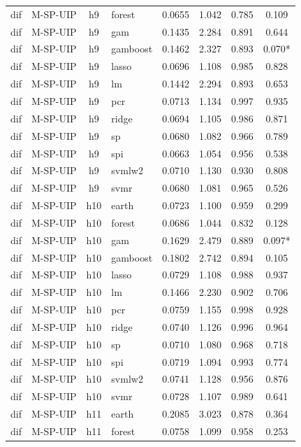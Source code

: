 \begin{ThreePartTable}
\begin{longtable}[t]{llclcccc}
dif & M-SP-UIP & h9 & forest & 0.0655 & 1.042 & 0.785 & 0.109\\
dif & M-SP-UIP & h9 & gam & 0.1435 & 2.284 & 0.891 & 0.644\\
dif & M-SP-UIP & h9 & gamboost & 0.1462 & 2.327 & 0.893 & 0.070*\\
dif & M-SP-UIP & h9 & lasso & 0.0696 & 1.108 & 0.985 & 0.828\\
dif & M-SP-UIP & h9 & lm & 0.1442 & 2.294 & 0.893 & 0.653\\
dif & M-SP-UIP & h9 & pcr & 0.0713 & 1.134 & 0.997 & 0.935\\
dif & M-SP-UIP & h9 & ridge & 0.0694 & 1.105 & 0.986 & 0.871\\
dif & M-SP-UIP & h9 & sp & 0.0680 & 1.082 & 0.966 & 0.789\\
dif & M-SP-UIP & h9 & spi & 0.0663 & 1.054 & 0.956 & 0.538\\
dif & M-SP-UIP & h9 & svmlw2 & 0.0710 & 1.130 & 0.930 & 0.808\\
dif & M-SP-UIP & h9 & svmr & 0.0680 & 1.081 & 0.965 & 0.526\\
\addlinespace
dif & M-SP-UIP & h10 & earth & 0.0723 & 1.100 & 0.959 & 0.299\\
dif & M-SP-UIP & h10 & forest & 0.0686 & 1.044 & 0.832 & 0.128\\
dif & M-SP-UIP & h10 & gam & 0.1629 & 2.479 & 0.889 & 0.097*\\
dif & M-SP-UIP & h10 & gamboost & 0.1802 & 2.742 & 0.894 & 0.105\\
dif & M-SP-UIP & h10 & lasso & 0.0729 & 1.108 & 0.988 & 0.937\\
dif & M-SP-UIP & h10 & lm & 0.1466 & 2.230 & 0.902 & 0.706\\
dif & M-SP-UIP & h10 & pcr & 0.0759 & 1.155 & 0.998 & 0.928\\
dif & M-SP-UIP & h10 & ridge & 0.0740 & 1.126 & 0.996 & 0.964\\
dif & M-SP-UIP & h10 & sp & 0.0710 & 1.080 & 0.968 & 0.718\\
dif & M-SP-UIP & h10 & spi & 0.0719 & 1.094 & 0.993 & 0.774\\
dif & M-SP-UIP & h10 & svmlw2 & 0.0741 & 1.128 & 0.956 & 0.876\\
dif & M-SP-UIP & h10 & svmr & 0.0728 & 1.107 & 0.989 & 0.641\\
\addlinespace
dif & M-SP-UIP & h11 & earth & 0.2085 & 3.023 & 0.878 & 0.364\\
dif & M-SP-UIP & h11 & forest & 0.0758 & 1.099 & 0.958 & 0.253\\

\end{longtable}
\end{ThreePartTable}
